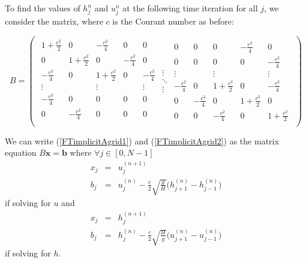 \documentclass[a4paper, 10.8pt, notitlepage]{article}
\begin{document}
To find the values of $h_{j}^{n}$ and $u_{j}^{n}$ at the following time iteration for all $j$, we consider the matrix, where $c$ is the Courant number as before:

\[
B = \left (
\begin{array}{ccc}
\begin{array}{ccccc}
1 + \frac{c^{2}}{2} & 0 & -\frac{c^{2}}{4} & 0 & 0\\
0& 1 + \frac{c^{2}}{2} & 0 & -\frac{c^{2}}{4} & 0\\
-\frac{c^{2}}{4} & 0& 1 + \frac{c^{2}}{2} & 0 & -\frac{c^{2}}{4}\\
\vdots & & \vdots & & \vdots\\
- \frac{c^{2}}{4} & 0 & 0 & 0 & 0\\
0 & - \frac{c^{2}}{4} & 0 & 0 & 0\\
\end{array}
\begin{array}{c}
\vdots\\ 
\ddots\\
\vdots
\end{array}
\begin{array}{ccccc}
0 & 0 & 0 & - \frac{c^{2}}{4} & 0\\
0 & 0 & 0 & 0 & - \frac{c^{2}}{4}\\
\vdots & & \vdots & & \vdots\\
-\frac{c^{2}}{4}& 0 & 1 + \frac{c^{2}}{2} & 0 & -\frac{c^{2}}{4} \\
0 & -\frac{c^{2}}{4} & 0 & 1 + \frac{c^{2}}{2} & 0\\
0 & 0 & -\frac{c^{2}}{4}& 0 & 1 + \frac{c^{2}}{2}
\end{array}
\end{array}
\right )
\]

We can write (\ref{FTimplicitAgrid1}) and (\ref{FTimplicitAgrid2}) as the matrix equation $B \mathbf{x} = \mathbf{b}$ where $\forall j \in [0, N-1]$
\begin{eqnarray}
x_{j} & = & u_{j}^{(n+1)}\\
b_{j} & = & u_{j}^{(n)} - \frac{c}{2}\sqrt{\frac{g}{H}}\bigg(h_{j+1}^{(n)} - h_{j-1}^{(n)}\bigg) 
\end{eqnarray}
if solving for $u$ and 
\begin{eqnarray}
x_{j} & = & h_{j}^{(n+1)}\\
b_{j} & = & h_{j}^{(n)} - \frac{c}{2}\sqrt{\frac{H}{g}}\bigg(u_{j+1}^{(n)} - u_{j-1}^{(n)}\bigg)
\end{eqnarray}
if solving for $h$.
\end{document}
